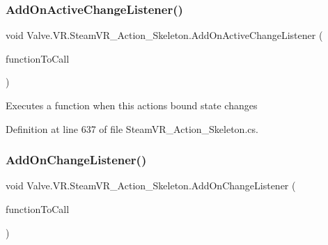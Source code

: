 \mbox{\label{class_valve_1_1_v_r_1_1_steam_v_r___action___skeleton_a25ef48bc746787e1432040dc0e2cf0fc}} 
\subsubsection{\texorpdfstring{AddOnActiveChangeListener()}{AddOnActiveChangeListener()}}
{\footnotesize\ttfamily void Valve.\+V\+R.\+Steam\+V\+R\+\_\+\+Action\+\_\+\+Skeleton.\+Add\+On\+Active\+Change\+Listener (\begin{DoxyParamCaption}\item[{\mbox{\hyperlink{class_valve_1_1_v_r_1_1_steam_v_r___action___skeleton_ae329ff2582f41c7ec52ecdf3b34b345a}{Active\+Change\+Handler}}}]{function\+To\+Call }\end{DoxyParamCaption})}



Executes a function when this action\textquotesingle{}s bound state changes 



Definition at line 637 of file Steam\+V\+R\+\_\+\+Action\+\_\+\+Skeleton.\+cs.

\mbox{\label{class_valve_1_1_v_r_1_1_steam_v_r___action___skeleton_ae5b064c4cc4ac0bdfd8677e126896cf4}} 
\subsubsection{\texorpdfstring{AddOnChangeListener()}{AddOnChangeListener()}}
{\footnotesize\ttfamily void Valve.\+V\+R.\+Steam\+V\+R\+\_\+\+Action\+\_\+\+Skeleton.\+Add\+On\+Change\+Listener (\begin{DoxyParamCaption}\item[{\mbox{\hyperlink{class_valve_1_1_v_r_1_1_steam_v_r___action___skeleton_a41a68545cb313ef9f47600d9e9022177}{Change\+Handler}}}]{function\+To\+Call }\end{DoxyParamCaption})}



